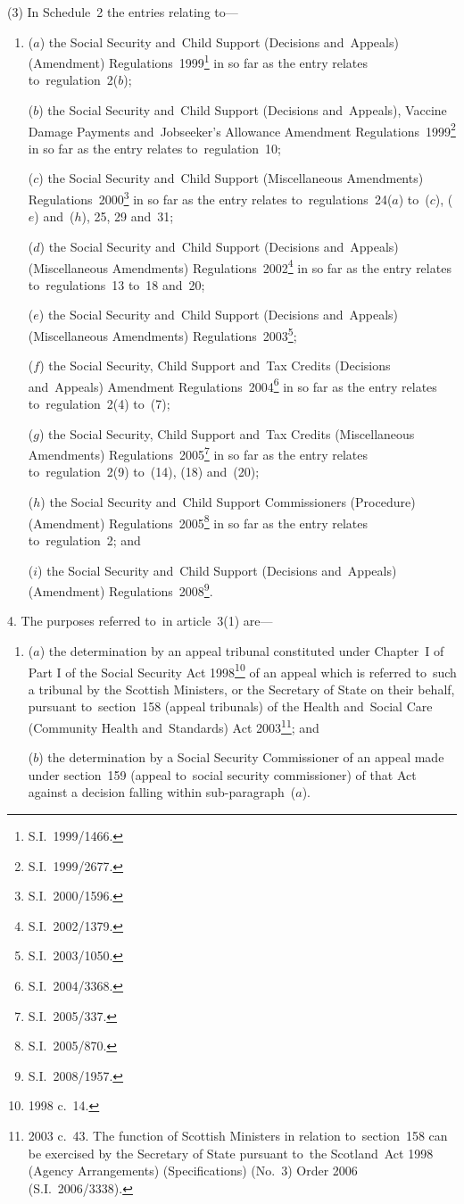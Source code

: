 \documentclass[12pt,a4paper]{article}
\begin{document}
(3) In Schedule~2 the entries relating to—
\begin{enumerate}\item[]
($a$) the Social Security and~Child Support (Decisions and~Appeals) (Amendment) Regulations~1999\footnote{S.I.~1999/1466.} in so far as the entry relates to~regulation~2($b$);

($b$) the Social Security and~Child Support (Decisions and~Appeals), Vaccine Damage Payments and~Jobseeker’s Allowance Amendment Regulations~1999\footnote{S.I.~1999/2677.} in so far as the entry relates to~regulation~10;

($c$) the Social Security and~Child Support (Miscellaneous Amendments) Regulations~2000\footnote{S.I.~2000/1596.} in so far as the entry relates to~regulations~24($a$)  to~($c$), ($e$)  and~($h$), 25, 29 and~31;

($d$) the Social Security and~Child Support (Decisions and~Appeals) (Miscellaneous Amendments) Regulations~2002\footnote{S.I.~2002/1379.} in so far as the entry relates to~regulations~13 to~18 and~20;

($e$) the Social Security and~Child Support (Decisions and~Appeals) (Miscellaneous Amendments) Regulations~2003\footnote{S.I.\ 2003/1050.};

($f$) the Social Security, Child Support and~Tax Credits (Decisions and~Appeals) Amendment Regulations~2004\footnote{S.I.~2004/3368.} in so far as the entry relates to~regulation~2(4) to~(7);

($g$) the Social Security, Child Support and~Tax Credits (Miscellaneous Amendments) Regulations~2005\footnote{S.I.~2005/337.} in so far as the entry relates to~regulation~2(9) to~(14), (18) and~(20);

($h$) the Social Security and~Child Support Commissioners (Procedure) (Amendment) Regulations~2005\footnote{S.I.~2005/870.} in so far as the entry relates to~regulation~2; and

($i$) the Social Security and~Child Support (Decisions and~Appeals) (Amendment) Regulations~2008\footnote{S.I.~2008/1957.}.
\end{enumerate}

\medskip

4.  The purposes referred to~in article~3(1) are—
\begin{enumerate}\item[]
($a$) the determination by an appeal tribunal constituted under Chapter~I of Part I of the Social Security Act 1998\footnote{1998 c.~14.} of an appeal which is referred to~such a tribunal by the Scottish Ministers, or the Secretary of State on their behalf, pursuant to~section~158 (appeal tribunals) of the Health and~Social Care (Community Health and~Standards) Act 2003\footnote{2003 c.~43. The function of Scottish Ministers in relation to~section~158 can be exercised by the Secretary of State pursuant to~the Scotland~Act 1998 (Agency Arrangements) (Specifications) (No.~3) Order 2006 (S.I.~2006/3338).}; and

($b$) the determination by a Social Security Commissioner of an appeal made under section~159 (appeal to~social security commissioner) of that Act against a decision falling within sub-paragraph~($a$).
\end{enumerate}
\end{document}
